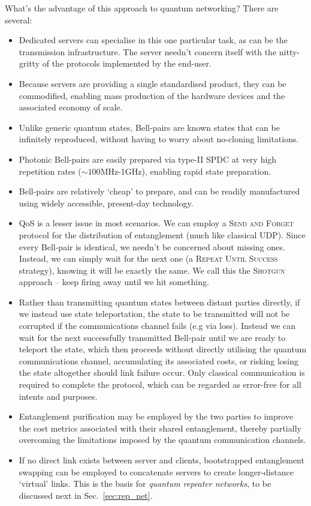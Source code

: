 \documentclass[aps,rmp,twocolumn,amsmath,amssymb,nofootinbib,superscriptaddress,longbibliography,floatfix,table-of-contents,eqsecnum]{revtex4-1}
\begin{document}
What's the advantage of this approach to quantum networking? There are several:
\begin{itemize}
\item Dedicated servers can specialise in this one particular task, as can be the transmission infrastructure. The server needn't concern itself with the nitty-gritty of the protocols implemented by the end-user.
\item Because servers are providing a single standardised product, they can be commodified, enabling mass production of the hardware devices and the associated economy of scale.
\item Unlike generic quantum states, Bell-pairs are known states that can be infinitely reproduced, without having to worry about no-cloning limitations.
\item Photonic Bell-pairs are easily prepared via type-II SPDC at very high repetition rates (\mbox{$\sim 100$MHz-1GHz}), enabling rapid state preparation.
\item Bell-pairs are relatively `cheap' to prepare, and can be readily manufactured using widely accessible, present-day technology.
\item QoS is a lesser issue in most scenarios. We can employ a \textsc{Send and Forget} protocol for the distribution of entanglement (much like classical UDP). Since every Bell-pair is identical, we needn't be concerned about missing ones. Instead, we can simply wait for the next one (a \textsc{Repeat Until Success} strategy), knowing it will be exactly the same. We call this the \textsc{Shotgun} approach -- keep firing away until we hit something.
\item Rather than transmitting quantum states between distant parties directly, if we instead use state teleportation, the state to be transmitted will not be corrupted if the communications channel fails (e.g via loss). Instead we can wait for the next successfully transmitted Bell-pair until we are ready to teleport the state, which then proceeds without directly utilising the quantum communications channel, accumulating its associated costs, or risking losing the state altogether should link failure occur. Only classical communication is required to complete the protocol, which can be regarded as error-free for all intents and purposes.
\item Entanglement purification may be employed by the two parties to improve the cost metrics associated with their shared entanglement, thereby partially overcoming the limitations imposed by the quantum communication channels.
\item If no direct link exists between server and clients, bootstrapped entanglement swapping can be employed to concatenate servers to create longer-distance `virtual' links. This is the basis for \textit{quantum repeater networks}, to be discussed next in Sec.~\ref{sec:rep_net}.
\end{itemize}
\end{document}
